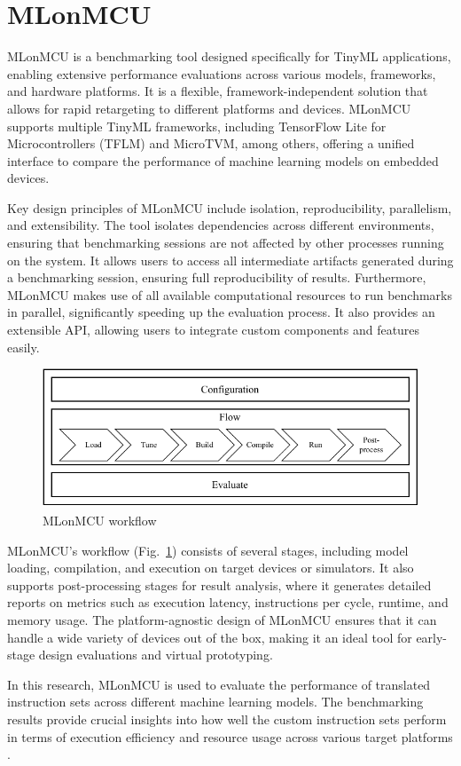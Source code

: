 \section{MLonMCU}
MLonMCU is a benchmarking tool designed specifically for TinyML applications, enabling extensive performance evaluations across various models, frameworks, and hardware platforms. It is a flexible, framework-independent solution that allows for rapid retargeting to different platforms and devices. MLonMCU supports multiple TinyML frameworks, including TensorFlow Lite for Microcontrollers (TFLM) and MicroTVM, among others, offering a unified interface to compare the performance of machine learning models on embedded devices.

Key design principles of MLonMCU include isolation, reproducibility, parallelism, and extensibility. The tool isolates dependencies across different environments, ensuring that benchmarking sessions are not affected by other processes running on the system. It allows users to access all intermediate artifacts generated during a benchmarking session, ensuring full reproducibility of results. Furthermore, MLonMCU makes use of all available computational resources to run benchmarks in parallel, significantly speeding up the evaluation process. It also provides an extensible API, allowing users to integrate custom components and features easily.

\begin{figure}[ht]
    \centering
    \includegraphics[width=\linewidth]{figures/MLonMCUStructureNew.pdf}
    \caption{MLonMCU workflow \cite{MLonMCU}}
    \label{fig:mlonmcu}
\end{figure}

MLonMCU's workflow (Fig.~\ref{fig:mlonmcu}) consists of several stages, including model loading, compilation, and execution on target devices or simulators. It also supports post-processing stages for result analysis, where it generates detailed reports on metrics such as execution latency, instructions per cycle, runtime, and memory usage. The platform-agnostic design of MLonMCU ensures that it can handle a wide variety of devices out of the box, making it an ideal tool for early-stage design evaluations and virtual prototyping.

In this research, MLonMCU is used to evaluate the performance of translated instruction sets across different machine learning models. The benchmarking results provide crucial insights into how well the custom instruction sets perform in terms of execution efficiency and resource usage across various target platforms \cite{MLonMCU}.
